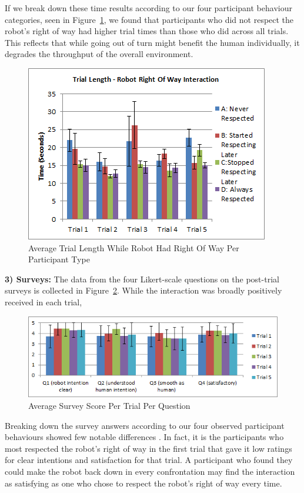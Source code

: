 \documentclass[letterpaper, 10 pt, conference]{ieeeconf}  %
\begin{document}
If we break down these time results according to our four participant behaviour categories, seen in Figure~\ref{fig:Respect}, we found that participants who did not respect the robot's right of way had higher trial times than those who did across all trials. This reflects that while going out of turn might benefit the human individually, it degrades the throughput of the overall environment. 

     \begin{figure}
      \centering
      \includegraphics{Robot_right.png}
      \caption{Average Trial Length While Robot Had Right Of Way Per Participant Type}
      \label{fig:Respect}
   \end{figure}

\textbf{3) Surveys:} The data from the four Likert-scale questions on the post-trial surveys is collected in Figure~\ref{fig:Questionnaire}. While the interaction was broadly positively received in each trial, 
 
     \begin{figure}
      \centering
      \includegraphics[width=\textwidth]{Questionnaire.png}
      \caption{Average Survey Score Per Trial Per Question }
      \label{fig:Questionnaire}
   \end{figure}
 

Breaking down the survey answers according to our four observed participant behaviours showed few notable differences . In fact, it is the participants who most respected the robot's right of way in the first trial that gave it low ratings for clear intentions and satisfaction for that trial. A participant who found they could make the robot back down in every confrontation may find the interaction as satisfying as one who chose to respect the robot's right of way every time.
\end{document}
